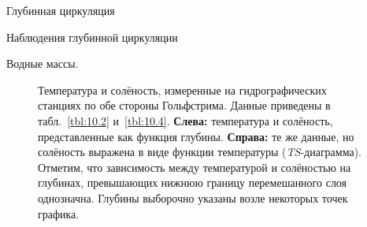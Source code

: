 \begin{chapter}{Глубинная циркуляция}
\begin{section}{Наблюдения глубинной циркуляции}
\begin{paragraph}{Водные массы.}
\begin{figure}[b!]
\caption{Температура и солёность, измеренные на гидрографических 
станциях по обе стороны
Гольфстрима. Данные приведены
в табл.~\ref{tbl:10.2} и~\ref{tbl:10.4}.  
\textbf{Слева:} температура и солёность, представленные как функция глубины.
\textbf{Справа:} те же данные, но солёность выражена в виде функции 
температуры (\emph{TS}-диаграмма).
Отметим, что зависимость между температурой и солёностью на глубинах,
превышающих нижнюю границу перемешанного 
слоя однозначна.
Глубины выборочно указаны возле некоторых точек графика.}
\label{fig:GulfStreamTSDPlot}
\end{figure}
%


\end{paragraph}
\end{section}
\end{chapter}
